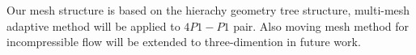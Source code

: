 \documentclass[a4paper, 11pt]{article}
\begin{document}
   Our mesh structure is based on the hierachy geometry tree
   structure, multi-mesh adaptive method will be applied to $4P1-P1$
   pair. Also moving mesh method for incompressible flow will be
   extended to three-dimention in future work. 
   

   



 
\end{document}
